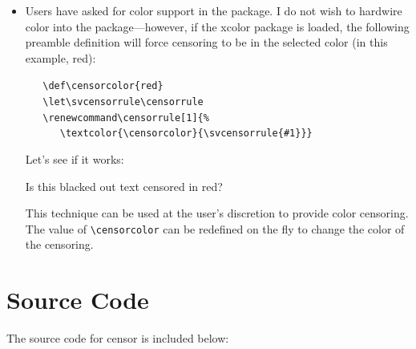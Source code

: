 \documentclass{article}
\begin{document}
\begin{itemize}
\item Users have asked for color support in the package.
I do not wish to hardwire color into the package---however,
  if the \textsf{xcolor} package is loaded,
  the following preamble definition will force censoring to be
  in the selected color (in this example, red):

\verb|   \def\censorcolor{red}|\\
\verb|   \let\svcensorrule\censorrule|\\
\verb|   \renewcommand\censorrule[1]{%|\\
\verb|      \textcolor{\censorcolor}{\svcensorrule{#1}}}|

Let's see if it works:

{\let\svcensorrule\censorrule
\renewcommand\censorrule[1]{\textcolor{red}{\svcensorrule{#1}}}
\addtolength\leftskip{2em}
Is this blacked out text censored in red?\\
\par}

This technique can be used at the user's discretion to provide color
  censoring.
The value of \verb|\censorcolor| can be redefined on the fly to change
  the color of the censoring.

\end{itemize}

\clearpage
\section{Source Code}

The source code for \textsf{censor} is included below:

\end{document}
